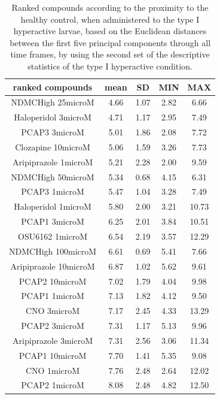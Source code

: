 \documentclass[a4paper,12pt]{article}
\begin{document}
\begin{table}[h!]\tiny
\centering
\caption{Ranked compounds according to the proximity to the healthy control, when administered to the type I hyperactive larvae, based on the Euclidean distances between the first five principal components through all time frames, by using the second set of the descriptive statistics of the type I hyperactive condition.}
\begin{tabular}{|c|c|c|c|c|}
\hline
ranked compounds             & mean & SD   & MIN  & MAX   \\ \hline
NDMCHigh 25microM     & 4.66  & 1.07  & 2.82 & 6.66  \\ \hline
Haloperidol 3microM   & 4.71  & 1.17  & 2.95 & 7.49  \\ \hline
PCAP3 3microM       & 5.01  & 1.86  & 2.08 & 7.72  \\ \hline
Clozapine 10microM    & 5.06  & 1.59  & 3.26 & 7.73  \\ \hline
Aripiprazole 1microM  & 5.21  & 2.28  & 2.00    & 9.59  \\ \hline
NDMCHigh 50microM     & 5.34  & 0.68  & 4.15 & 6.31  \\ \hline
PCAP3 1microM       & 5.47  & 1.04  & 3.28 & 7.49  \\ \hline
Haloperidol 1microM   & 5.80   & 2.00     & 3.21 & 10.73 \\ \hline
PCAP1 3microM         & 6.25  & 2.01  & 3.84 & 10.51 \\ \hline
OSU6162 1microM       & 6.54  & 2.19  & 3.57 & 12.29 \\ \hline
NDMCHigh 100microM    & 6.61  & 0.69  & 5.41 & 7.66  \\ \hline
Aripiprazole 10microM & 6.87  & 1.02  & 5.62 & 9.61  \\ \hline
PCAP2 10microM        & 7.02  & 1.79  & 4.04 & 9.98  \\ \hline
PCAP1 1microM         & 7.13  & 1.82  & 4.12 & 9.50   \\ \hline
CNO 3microM           & 7.17  & 2.45  & 4.33 & 13.29 \\ \hline
PCAP2 3microM         & 7.31  & 1.17  & 5.13 & 9.96  \\ \hline
Aripiprazole 3microM  & 7.31  & 2.56  & 3.06 & 11.34 \\ \hline
PCAP1 10microM        & 7.70   & 1.41  & 5.35 & 9.08  \\ \hline
CNO 1microM           & 7.76  & 2.48  & 2.64 & 12.02 \\ \hline
PCAP2 1microM         & 8.08  & 2.48  & 4.82 & 12.50  \\ \hline

\end{tabular}
\end{table}
\end{document}
